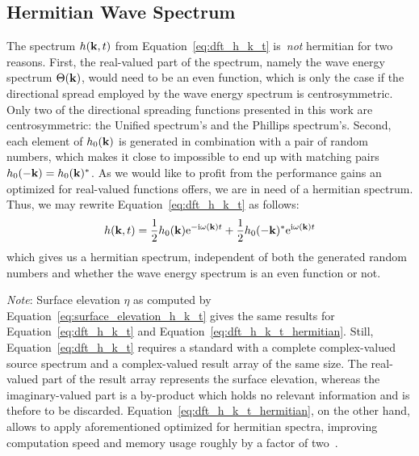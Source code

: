 \subsection{Hermitian Wave Spectrum}
The spectrum $h(\mathbf{k},t)$ from Equation~\ref{eq:dft_h_k_t} is~\emph{not}
hermitian for two reasons. First, the real-valued part of the spectrum, namely
the wave energy spectrum $\Theta(\mathbf{k})$, would need to be an even function,
which is only the case if the directional spread employed by
the wave energy spectrum is centrosymmetric. Only two of the directional spreading functions
presented in this work are centrosymmetric: the Unified spectrum's and the Phillips spectrum's.
Second, each element of $h_0(\mathbf{k})$ is generated in combination with a pair of random numbers,
which makes it close to impossible to end up with matching pairs $h_0(-\mathbf{k})=h_0(\mathbf{k})^*$.
As we would like to profit from the performance gains an optimized \InvFourierTransform
for real-valued functions offers, we are in need of a hermitian spectrum. Thus, we may
rewrite Equation~\ref{eq:dft_h_k_t} as follows:
%
\begin{equation}
\label{eq:dft_h_k_t_hermitian}
 h(\mathbf{k}, t) =
 \frac{1}{2} h_0(\mathbf{k})\mathrm{e}^{-\mathrm{i}\omega(\mathbf{k})t}
 + \frac{1}{2} h_0(\mathbf{-k})^*\mathrm{e}^{\mathrm{i}\omega(\mathbf{k})t}
\end{equation}
%
which gives us a hermitian spectrum, independent of both the generated random numbers and 
whether the wave energy spectrum is an even function or not.

\emph{Note}: Surface elevation $\eta$ as computed by Equation~\ref{eq:surface_elevation_h_k_t}
gives the same results for Equation~\ref{eq:dft_h_k_t} and Equation~\ref{eq:dft_h_k_t_hermitian}.
Still, Equation~\ref{eq:dft_h_k_t} requires a standard \InvFourierTransform
with a complete complex-valued source spectrum and a
complex-valued result array of the same size. The real-valued part of the result array
represents the surface elevation, whereas the imaginary-valued part is a by-product
which holds no relevant information and is thefore to be discarded.
Equation~\ref{eq:dft_h_k_t_hermitian}, on the other hand, allows to apply
aforementioned \InvFourierTransform optimized for hermitian spectra, improving
computation speed and memory usage roughly by a factor of two~\citep{fftw:manual}.
%
